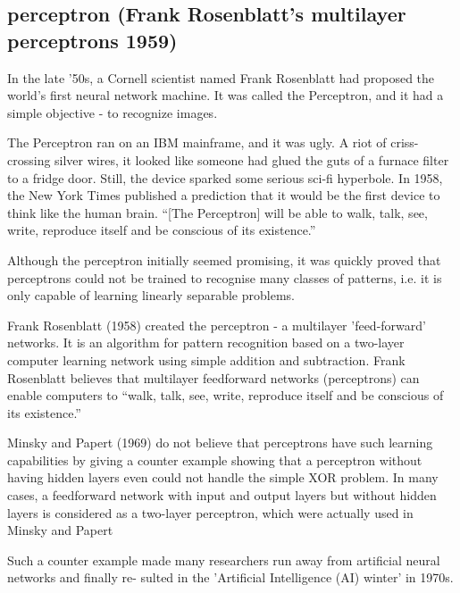 \subsection{perceptron (Frank Rosenblatt's multilayer perceptrons 1959)}
\label{sec:perceptron}

In the late ’50s, a Cornell scientist named Frank Rosenblatt had proposed the
world’s first neural network machine. It was called the Perceptron, and it had a
simple objective - to recognize images.

The Perceptron ran on an IBM mainframe, and it was ugly. A riot of
criss-crossing silver wires, it looked like someone had glued the guts of a
furnace filter to a fridge door. Still, the device sparked some serious sci-fi
hyperbole. In 1958, the New York Times published a prediction that it would be
the first device to think like the human brain. “[The Perceptron] will be able
to walk, talk, see, write, reproduce itself and be conscious of its existence.”

Although the perceptron initially seemed promising, it was quickly proved that
perceptrons could not be trained to recognise many classes of patterns, i.e. it
is only capable of learning linearly separable problems.


Frank Rosenblatt (1958) created the perceptron - a multilayer 'feed-forward'
networks.  It is an algorithm for pattern recognition based on a two-layer
computer learning network using simple addition and subtraction.
Frank  Rosenblatt  believes  that  multilayer  feedforward   networks
(perceptrons)   can   enable   computers   to ``walk, talk, see, write,
reproduce itself and be conscious of its existence.''  

Minsky and Papert  (1969) do not believe that perceptrons  have  such  learning
capabilities  by  giving  a counter example showing that a perceptron without
having hidden  layers  even could  not  handle  the  simple  XOR problem.
In many cases, a feedforward network with input and output layers but without
hidden layers is considered as a two-layer perceptron, which were actually used
in Minsky and  Papert

Such a counter example made many researchers run  away  from  artificial  neural
networks  and  finally  re- sulted in the 'Artificial Intelligence (AI) winter'
in 1970s.

